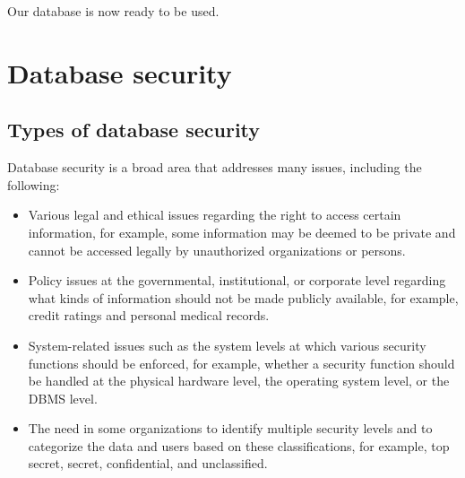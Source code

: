 \documentclass[a4paper]{article}
\numberwithin{equation}{section}
\begin{document}
Our database is now ready to be used.

\pagebreak



\section{Database security}
\subsection{Types of database security}
Database security is a broad area that addresses many issues, including the following:
\begin{itemize}
  \item  Various legal and ethical issues regarding the right to access certain information, for example, some information may be deemed to be private and cannot be accessed legally by unauthorized organizations or persons.
  \item Policy issues at the governmental, institutional, or corporate level regarding what kinds of information should not be made publicly available, for example, credit ratings and personal medical records.
  \item System-related issues such as the system levels at which various security functions should be enforced, for example, whether a security function should be handled at the physical hardware level, the operating system level, or the DBMS level.
  \item The need in some organizations to identify multiple security levels and to categorize the data and users based on these classifications, for example, top secret, secret, confidential, and unclassified.
\end{itemize}
\end{document}
